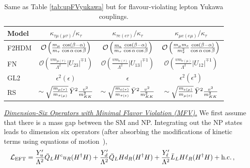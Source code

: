 \documentclass[../report.tex]{subfiles}
\begin{document}
\begin{table}[t]
\begin{center}
\begin{tabular}{l  c  c  c }
	\toprule[0.1em]
	Model	&   $\kappa_{\tau\mu (\mu\tau)}/\kappa_\tau$ & $\kappa_{\tau e (e\tau)}/\kappa_\tau$  & $\kappa_{\mu e (e\mu)}/\kappa_\tau$ \\ \midrule[0.05em]\vspace{0.15cm}
	F2HDM & $\mathcal{O}\left(\frac{m_\mu}{m_\tau}\frac{\cos(\beta-\alpha)}{\cos\alpha\cos\beta}\right)$ & $\mathcal{O}\left(\frac{m_e}{m_\tau}\frac{\cos(\beta-\alpha)}{\cos\alpha\cos\beta}\right)$ & $\mathcal{O}\left(\frac{m_\mu m_e}{m_\tau^2}\frac{\cos(\beta-\alpha)}{\cos\alpha\cos\beta}\right)$ \\\vspace{0.15cm}
		FN & $\mathcal{O}\left(\frac{v m_{\mu(\tau)}}{\Lambda^2} |U_{23}|^{\mp1}\right)$ & $\mathcal{O}\left(\frac{v m_{e(\tau)}}{\Lambda^2}|U_{13}|^{\mp1}\right)$ & $\mathcal{O}\left(\frac{v m_{e(\mu)}}{\Lambda^2}|U_{12}|^{\mp1}\right)$ \\\vspace{0.15cm}
GL2	&$\epsilon^2 (\epsilon)$ & $\epsilon$ & $\epsilon^2(\epsilon^3)$\\
	RS & $\sim\sqrt{\frac{m_{\mu(\tau)}}{m_{\tau(\mu)}}}\,\bar Y^2 \frac{v^2}{m_{KK}^2}$ &
		$\sim\sqrt{\frac{m_{e(\tau)}}{m_{\tau(e)}}}\,\bar Y^2 \frac{v^2}{m_{KK}^2}$&
		$\sim\sqrt{\frac{m_{e(\mu)}}{m_{\mu(e)}}}\,\bar Y^2 \frac{v^2}{m_{KK}^2}$\\
	\bottomrule[0.1em]
\end{tabular}
\caption{Same as Table  \ref{tab:upFVyukawa} but for flavour-violating lepton Yukawa couplings. 
}
\label{tab:leptFVyukawa}
\end{center}
\end{table}
\underline{\it Dimension-Six Operators with Minimal Flavor Violation (MFV).}
We first assume that there is a mass gap between the SM and NP. Integrating out the NP states leads to dimension six operators (after absorbing the modifications of kinetic terms using equations of motion~\cite{AguilarSaavedra:2009mx}), 
\begin{equation}
\begin{split}\label{eq:EFT:MFV}
	\mathcal{L}_{\rm EFT} &=  \frac{Y_u^\prime}{\Lambda^2}\bar{Q}_L H^c u_R
        (H^\dagger H)+ \frac{Y_d^\prime}{\Lambda^2} \bar{Q}_L H d_R
        (H^\dagger H)+\frac{Y_\ell^\prime}{\Lambda^2} \bar{L}_L H \ell_R
        (H^\dagger H)+\text{h.c.}\,, 
\end{split}
\end{equation}
\end{document}

